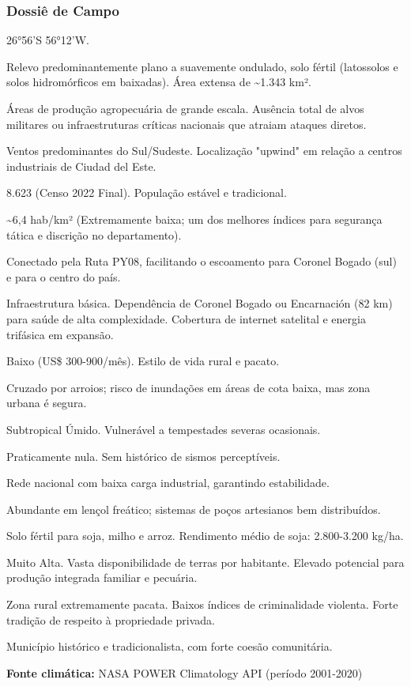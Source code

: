 \subsubsection{Dossiê de Campo}
\begin{description}[style=nextline,leftmargin=0.5cm,font=\bfseries]
\item[Coordenadas]  26°56'S 56°12'W.
\item[Topografia]  Relevo predominantemente plano a suavemente ondulado, solo fértil (latossolos e solos hidromórficos em baixadas). Área extensa de \textasciitilde 1.343 km².
\item[Alvos Estratégicos]  Áreas de produção agropecuária de grande escala. Ausência total de alvos militares ou infraestruturas críticas nacionais que atraiam ataques diretos.
\item[Fallout]  Ventos predominantes do Sul/\allowbreak Sudeste. Localização "upwind" em relação a centros industriais de Ciudad del Este.
\item[População]  8.623 (Censo 2022 Final). População estável e tradicional.
\item[Densidade]  \textasciitilde 6,4 hab/\allowbreak km² (Extremamente baixa; um dos melhores índices para segurança tática e discrição no departamento).
\item[Vias de Acesso]  Conectado pela Ruta PY08, facilitando o escoamento para Coronel Bogado (sul) e para o centro do país.
\item[Serviços]  Infraestrutura básica. Dependência de Coronel Bogado ou Encarnación (82 km) para saúde de alta complexidade. Cobertura de internet satelital e energia trifásica em expansão.
\item[Custo de Vida]  Baixo (US\$ 300-900/\allowbreak mês). Estilo de vida rural e pacato.
\item[Hidrologia]  Cruzado por arroios; risco de inundações em áreas de cota baixa, mas zona urbana é segura.
\item[Clima]  Subtropical Úmido. Vulnerável a tempestades severas ocasionais.
\item[Sismicidade]  Praticamente nula. Sem histórico de sismos perceptíveis.
\item[Energia]  Rede nacional com baixa carga industrial, garantindo estabilidade.
\item[Água]  Abundante em lençol freático; sistemas de poços artesianos bem distribuídos.
\item[Solo]  Solo fértil para soja, milho e arroz. Rendimento médio de soja: 2.800-3.200 kg/\allowbreak ha.
\item[Autossuficiência]  Muito Alta. Vasta disponibilidade de terras por habitante. Elevado potencial para produção integrada familiar e pecuária.
\item[Segurança]  Zona rural extremamente pacata. Baixos índices de criminalidade violenta. Forte tradição de respeito à propriedade privada.
\item[Leis Local]  Município histórico e tradicionalista, com forte coesão comunitária.
\end{description}
\textbf{Fonte climática:} NASA POWER Climatology API (período 2001-2020)

